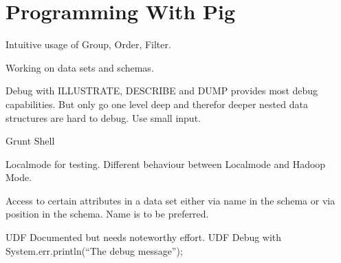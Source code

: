 \section{Programming With Pig}

Intuitive usage of Group, Order, Filter.

Working on data sets and schemas.

Debug with ILLUSTRATE, DESCRIBE and DUMP provides most debug capabilities. But only go one level deep and therefor deeper nested data structures are hard to debug. Use small input. 

Grunt Shell

Localmode for testing. Different behaviour between Localmode and Hadoop Mode.

Access to certain attributes in a data set either via name in the schema or via position in the schema. Name is to be preferred.

UDF Documented but needs noteworthy effort.
UDF Debug with System.err.println(``The debug message'');                    

